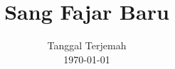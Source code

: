 






\pagestyle{empty}
\title{Sang Fajar Baru}
\date{Tanggal Terjemah\\
      \today}
\maketitle


\pagestyle{mystyle}
\setcounter{page}{1}
